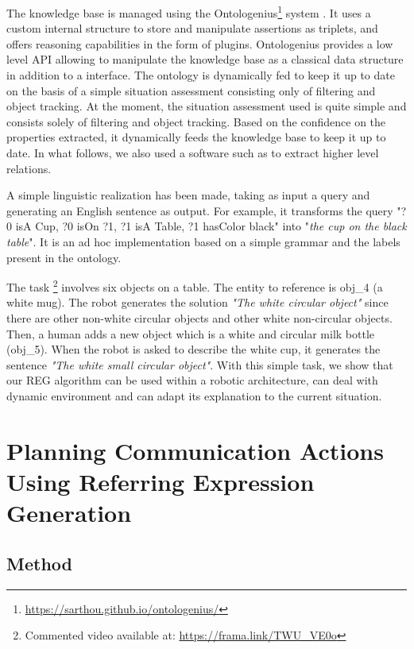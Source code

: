\documentclass[a4paper,11pt,twoside]{StyleThese}
\begin{document}
The knowledge base is managed using the Ontologenius\footnote{\url{https://sarthou.github.io/ontologenius/}} system \cite{sarthou2019ontologenius}. 
It uses a custom internal structure to store and manipulate assertions as triplets, and offers reasoning capabilities in the form of plugins. Ontologenius provides a low level API allowing to manipulate the knowledge base as a classical data structure in addition to a \sparql{} interface.
The ontology is dynamically fed to keep it up to date on the basis of a simple situation assessment consisting only of filtering and object tracking. At the moment, the situation assessment used is quite simple and consists solely of filtering and object tracking. Based on the confidence on the properties extracted, it dynamically feeds the knowledge base to keep it up to date. In what follows, we also used a software such as \cite{milliez2014framework} to extract higher level relations.

A simple linguistic realization has been made, taking as input a \sparql{} query and generating an English sentence as output. For example, it transforms the query "?0 isA Cup, ?0 isOn ?1, ?1 isA Table, ?1 hasColor black" into "\textit{the cup on the black table}". It is an ad hoc implementation based on a simple grammar and the labels present in the ontology. 

The task \footnote{Commented video available at: \url{https://frama.link/TWU\_VE0o}} involves six objects on a table. The entity to reference is obj\_4 (a white mug). The robot generates the solution \textit{"The white circular object"} since there are other non-white circular objects and other white non-circular objects. Then, a human adds a new object which is a white and circular milk bottle (obj\_5). When the robot is asked to describe the white cup, it generates the sentence \textit{"The white small circular object"}. With this simple task, we show that our REG algorithm can be used within a robotic architecture, can deal with dynamic environment and can adapt its explanation to the current situation.



\section{Planning Communication Actions Using Referring Expression Generation}
\subsection{Method}
\label{sec:Integration}
\end{document}
